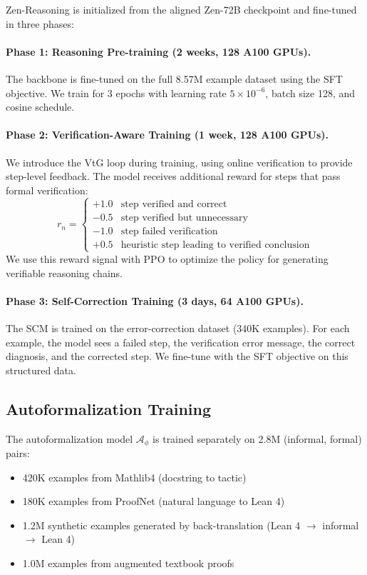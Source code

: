 \documentclass[11pt,a4paper]{article}
\begin{document}
Zen-Reasoning is initialized from the aligned Zen-72B checkpoint and fine-tuned in three phases:

\paragraph{Phase 1: Reasoning Pre-training (2 weeks, 128 A100 GPUs).} The backbone is fine-tuned on the full 8.57M example dataset using the SFT objective. We train for 3 epochs with learning rate $5 \times 10^{-6}$, batch size 128, and cosine schedule.

\paragraph{Phase 2: Verification-Aware Training (1 week, 128 A100 GPUs).} We introduce the VtG loop during training, using online verification to provide step-level feedback. The model receives additional reward for steps that pass formal verification:
\begin{equation}
    r_n = \begin{cases}
        +1.0 & \text{step verified and correct} \\
        -0.5 & \text{step verified but unnecessary} \\
        -1.0 & \text{step failed verification} \\
        +0.5 & \text{heuristic step leading to verified conclusion}
    \end{cases}
\end{equation}
We use this reward signal with PPO to optimize the policy for generating verifiable reasoning chains.

\paragraph{Phase 3: Self-Correction Training (3 days, 64 A100 GPUs).} The SCM is trained on the error-correction dataset (340K examples). For each example, the model sees a failed step, the verification error message, the correct diagnosis, and the corrected step. We fine-tune with the SFT objective on this structured data.

\subsection{Autoformalization Training}

The autoformalization model $\mathcal{A}_\phi$ is trained separately on 2.8M (informal, formal) pairs:
\begin{itemize}
    \item 420K examples from Mathlib4 (docstring to tactic)
    \item 180K examples from ProofNet (natural language to Lean 4)
    \item 1.2M synthetic examples generated by back-translation (Lean 4 $\rightarrow$ informal $\rightarrow$ Lean 4)
    \item 1.0M examples from augmented textbook proofs
\end{itemize}
\end{document}
